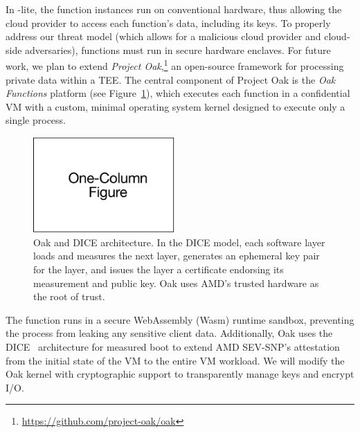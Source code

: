 In \SystemName-lite, the function instances run on conventional hardware, thus
allowing the cloud provider to access each function's data, including its keys.
%
To properly address our threat model (which allows for a malicious cloud
provider and cloud-side adversaries), functions must run in secure hardware
enclaves.
%
For future work, we plan to extend \emph{Project Oak},\footnote{
\url{https://github.com/project-oak/oak}
}
an open-source framework for processing private data within a TEE\@.
%
The central component of Project Oak is the \emph{Oak Functions} platform (see
Figure~\ref{fig:oak}), which executes each function in a confidential VM with a
custom, minimal operating system kernel designed to execute only a single
process.
%
\begin{figure}
    \centering
    \includegraphics[page = 3, width=0.48\textwidth]{diagrams/slides.pdf}
    \caption{Oak and DICE architecture.
    In the DICE model, each software layer loads and measures the next layer,
    generates an ephemeral key pair for the layer, and issues the layer a
    certificate endorsing its measurement and public key.
    Oak uses AMD's trusted hardware as the root of trust.
    }
    \label{fig:oak}
\end{figure}
%
The function runs in a secure WebAssembly (Wasm) runtime sandbox, preventing
the process from leaking any sensitive client data.
%
Additionally, Oak uses the DICE~\cite{24-misc-dice} architecture for measured
boot to extend AMD SEV-SNP's attestation from the initial state of the VM
to the entire VM workload.
%
%
We will modify the Oak kernel with cryptographic support to transparently
manage keys and encrypt I/O\@.





